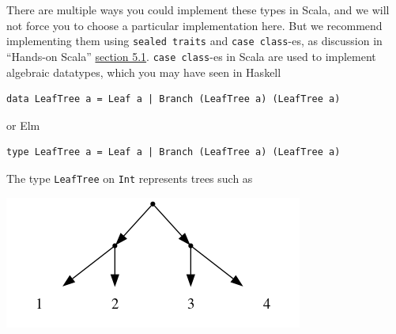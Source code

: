 \documentclass[11pt]{article}
\begin{document}
There are multiple ways you could implement these types in Scala,
and we will not force you to choose a particular implementation here.
But we recommend implementing them using \texttt{sealed traits} and \texttt{case class}-es,
as discussion in “Hands-on Scala”
\href{https://www.handsonscala.com/chapter-5-notable-scala-features.html\#section-5-1-case-classes-and-sealed-traits}{section 5.1}.
\texttt{case class}-es in Scala are used to implement algebraic datatypes,
which you may have seen in Haskell
\begin{verbatim}
data LeafTree a = Leaf a | Branch (LeafTree a) (LeafTree a)
\end{verbatim}
or Elm
\begin{verbatim}
type LeafTree a = Leaf a | Branch (LeafTree a) (LeafTree a)
\end{verbatim}

The type \texttt{LeafTree} on \texttt{Int} represents trees such as
\begin{center}
\includegraphics[width=\textwidth]{media/LeafTree.png}
\end{center}
\end{document}
